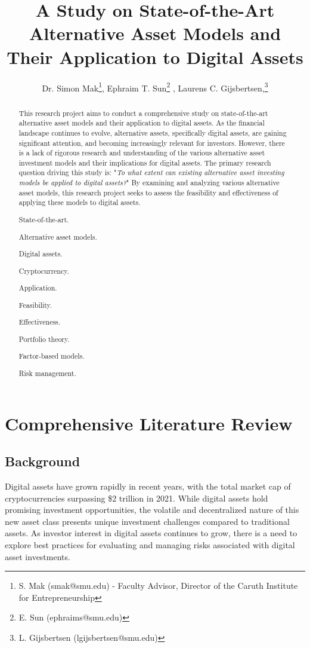 \documentclass{ledger}
\title{A Study on State-of-the-Art Alternative Asset Models and Their Application to Digital Assets
}
\author{Dr. Simon Mak\thanks{S. Mak (smak@smu.edu) - Faculty Advisor, Director of the Caruth Institute for Entrepreneurship}, Ephraim T. Sun\thanks{E. Sun (ephraims@smu.edu)} , Laurens C. Gijsbertsen,\thanks{L. Gijsbertsen (lgijsbertsen@smu.edu)}}
\begin{document}
\maketitle

\thispagestyle{pagefirst}

\begin{abstract}
This research project aims to conduct a comprehensive study on state-of-the-art alternative asset models and their application to digital assets. As the financial landscape continues to evolve, alternative assets, specifically digital assets, are gaining significant attention, and becoming increasingly relevant for investors. However, there is a lack of rigorous research and understanding of the various alternative asset investment models and their implications for digital assets. The primary research question driving this study is: "\textit{To what extent can existing alternative asset investing models be applied to digital assets?}" By examining and analyzing various alternative asset models, this research project seeks to assess the feasibility and effectiveness of applying these models to digital assets.

\begin{keywords}
\item State-of-the-art.
\item Alternative asset models.
\item Digital assets.
\item Cryptocurrency.
\item Application.
\item Feasibility.
\item Effectiveness.
\item Portfolio theory.
\item Factor-based models.
\item Risk management.
\end{keywords}
\end{abstract}

\section{Comprehensive Literature Review}
\subsection{Background}
Digital assets have grown rapidly in recent years, with the total market cap of cryptocurrencies surpassing \$2 trillion in 2021. While digital assets hold promising investment opportunities, the volatile and decentralized nature of this new asset class presents unique investment challenges compared to traditional assets. As investor interest in digital assets continues to grow, there is a need to explore best practices for evaluating and managing risks associated with digital asset investments.
\end{document}
